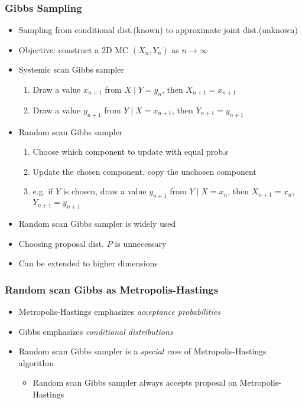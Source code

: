 \subsubsection*{Gibbs Sampling}
\begin{itemize}
    \item Sampling from conditional dist.(known) to approximate joint dist.(unknown)
    \item Objective: construct a 2D MC $(X_n,Y_n)$ as $n\to\infty$
    \item Systemic scan Gibbs sampler
    \begin{enumerate}
        \item Draw a value $x_{n+1}$ from $X\mid Y=y_n$, then $X_{n+1}=x_{n+1}$
        \item Draw a value $y_{n+1}$ from $Y\mid X=x_{n+1}$, then $Y_{n+1}=y_{n+1}$
    \end{enumerate}
    \item Random scan Gibbs sampler
    \begin{enumerate}
        \item Choose which component to update with equal prob.s
        \item Update the chosen component, copy the unchosen component
        \item e.g. if $Y$ is chosen, draw a value $y_{n+1}$ from $Y\mid X=x_n$, then $X_{n+1}=x_n$, $Y_{n+1}=y_{n+1}$
    \end{enumerate}
    \item Random scan Gibbs sampler is widely used
    \item Choosing proposal dist. $P$ is unnecessary
    \item Can be extended to higher dimensions
\end{itemize}

\subsubsection*{Random scan Gibbs as Metropolis-Hastings}
\begin{itemize}
    \item Metropolis-Hastings emphasizes \textit{acceptance probabilities}
    \item Gibbs emphasizes \textit{conditional distributions}
    \item Random scan Gibbs sampler is a \textit{special case} of Metropolis-Hastings algorithm
    \begin{itemize}
        \item Random scan Gibbs sampler always accepts proposal on Metropolis-Hastings
    \end{itemize}
\end{itemize}
